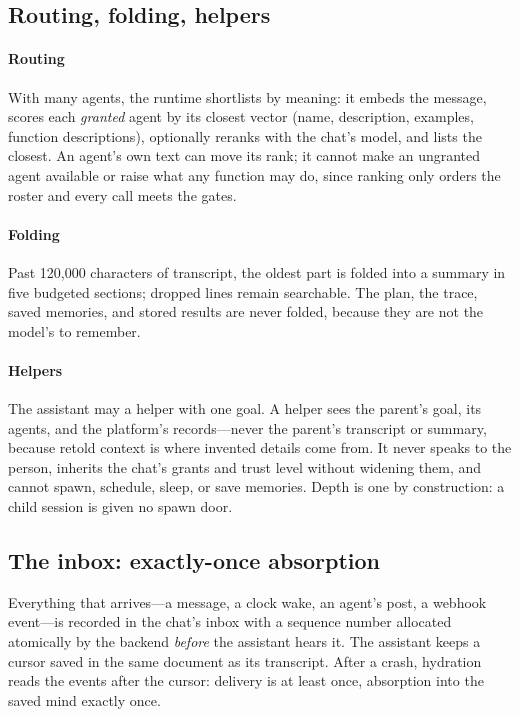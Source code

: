 \subsection{Routing, folding, helpers}

\paragraph{Routing}
With many agents, the runtime shortlists by meaning: it embeds the
message, scores each \emph{granted} agent by its closest vector (name,
description, examples, function descriptions), optionally reranks with
the chat's model, and lists the closest. An agent's own text can move
its rank; it cannot make an ungranted agent available or raise what any
function may do, since ranking only orders the roster and every call
meets the gates.

\paragraph{Folding}
Past 120{,}000 characters of transcript, the oldest part is folded
into a summary in five budgeted sections; dropped lines remain
searchable. The plan, the trace, saved memories, and stored results are
never folded, because they are not the model's to remember.

\paragraph{Helpers}
The assistant may  a helper with one goal. A helper sees
the parent's goal, its agents, and the platform's records---never the
parent's transcript or summary, because retold context is where
invented details come from. It never speaks to the person, inherits
the chat's grants and trust level without widening them, and cannot
spawn, schedule, sleep, or save memories. Depth is one by construction:
a child session is given no spawn door.

\subsection{The inbox: exactly-once absorption}

Everything that arrives---a message, a clock wake, an agent's post, a
webhook event---is recorded in the chat's inbox with a sequence number
allocated atomically by the backend \emph{before} the assistant hears
it. The assistant keeps a cursor saved in the same document as its
transcript. After a crash, hydration reads the events after the cursor:
delivery is at least once, absorption into the saved mind exactly once.

